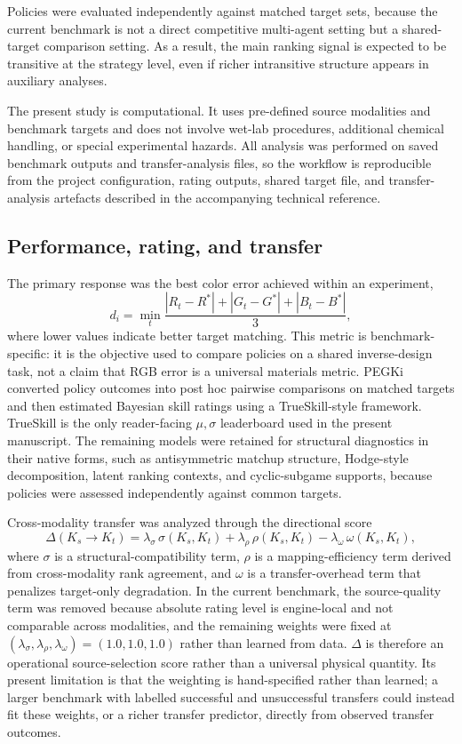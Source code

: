 \documentclass[twoside,twocolumn,9pt]{article}
\begin{document}
Policies were evaluated independently against matched target sets, because the current benchmark is not a direct competitive multi-agent setting but a shared-target comparison setting. As a result, the main ranking signal is expected to be transitive at the strategy level, even if richer intransitive structure appears in auxiliary analyses.

The present study is computational. It uses pre-defined source modalities and benchmark targets and does not involve wet-lab procedures, additional chemical handling, or special experimental hazards. All analysis was performed on saved benchmark outputs and transfer-analysis files, so the workflow is reproducible from the project configuration, rating outputs, shared target file, and transfer-analysis artefacts described in the accompanying technical reference.

\subsection{Performance, rating, and transfer}

The primary response was the best color error achieved within an experiment,
\[
d_i=\min_t \frac{|R_t-R^\ast|+|G_t-G^\ast|+|B_t-B^\ast|}{3},
\]
where lower values indicate better target matching. This metric is benchmark-specific: it is the objective used to compare policies on a shared inverse-design task, not a claim that RGB error is a universal materials metric. PEGKi converted policy outcomes into post hoc pairwise comparisons on matched targets and then estimated Bayesian skill ratings using a TrueSkill-style framework.\cite{Herbrich2006TrueSkill} TrueSkill is the only reader-facing $\mu,\sigma$ leaderboard used in the present manuscript. The remaining models were retained for structural diagnostics in their native forms, such as antisymmetric matchup structure, Hodge-style decomposition, latent ranking contexts, and cyclic-subgame supports, because policies were assessed independently against common targets.

Cross-modality transfer was analyzed through the directional score
\[
\Delta(K_s \rightarrow K_t)=
\lambda_{\sigma}\,\sigma(K_s,K_t)+
\lambda_{\rho}\,\rho(K_s,K_t)-
\lambda_{\omega}\,\omega(K_s,K_t),
\]
where $\sigma$ is a structural-compatibility term, $\rho$ is a mapping-efficiency term derived from cross-modality rank agreement, and $\omega$ is a transfer-overhead term that penalizes target-only degradation. In the current benchmark, the source-quality term was removed because absolute rating level is engine-local and not comparable across modalities, and the remaining weights were fixed at $(\lambda_{\sigma},\lambda_{\rho},\lambda_{\omega})=(1.0,1.0,1.0)$ rather than learned from data. $\Delta$ is therefore an operational source-selection score rather than a universal physical quantity. Its present limitation is that the weighting is hand-specified rather than learned; a larger benchmark with labelled successful and unsuccessful transfers could instead fit these weights, or a richer transfer predictor, directly from observed transfer outcomes.
\end{document}
